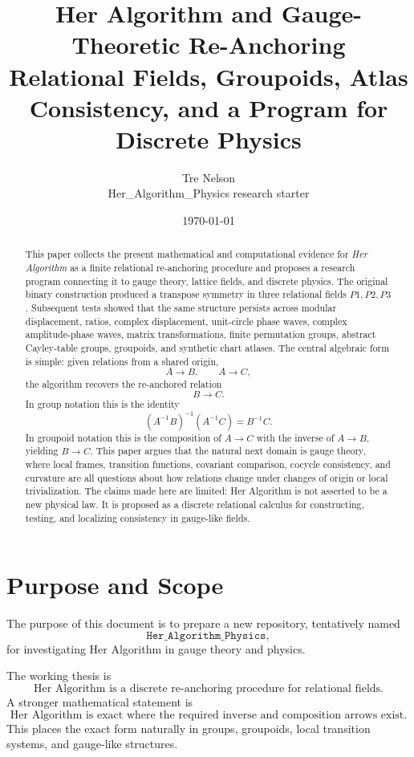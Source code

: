 \documentclass[11pt]{article}
\title{\textbf{Her Algorithm and Gauge-Theoretic Re-Anchoring}\\
\large Relational Fields, Groupoids, Atlas Consistency, and a Program for Discrete Physics}
\author{Tre Nelson\\\small Her\_Algorithm\_Physics research starter}
\date{\today}
\newcommand{\HA}{Her Algorithm}
\begin{document}
\maketitle

\begin{abstract}
This paper collects the present mathematical and computational evidence for \emph{Her Algorithm} as a finite relational re-anchoring procedure and proposes a research program connecting it to gauge theory, lattice fields, and discrete physics. The original binary construction produced a transpose symmetry in three relational fields \(P1,P2,P3\). Subsequent tests showed that the same structure persists across modular displacement, ratios, complex displacement, unit-circle phase waves, complex amplitude-phase waves, matrix transformations, finite permutation groups, abstract Cayley-table groups, groupoids, and synthetic chart atlases. The central algebraic form is simple: given relations from a shared origin,
\[
A\to B,\qquad A\to C,
\]
the algorithm recovers the re-anchored relation
\[
B\to C.
\]
In group notation this is the identity
\[
(A^{-1}B)^{-1}(A^{-1}C)=B^{-1}C.
\]
In groupoid notation this is the composition of \(A\to C\) with the inverse of \(A\to B\), yielding \(B\to C\). This paper argues that the natural next domain is gauge theory, where local frames, transition functions, covariant comparison, cocycle consistency, and curvature are all questions about how relations change under changes of origin or local trivialization. The claims made here are limited: \HA{} is not asserted to be a new physical law. It is proposed as a discrete relational calculus for constructing, testing, and localizing consistency in gauge-like fields.
\end{abstract}

\tableofcontents

\section{Purpose and Scope}

The purpose of this document is to prepare a new repository, tentatively named
\[
\texttt{Her\_Algorithm\_Physics},
\]
for investigating \HA{} in gauge theory and physics.

The working thesis is
\[
\boxed{\text{\HA{} is a discrete re-anchoring procedure for relational fields.}}
\]
A stronger mathematical statement is
\[
\boxed{\text{\HA{} is exact where the required inverse and composition arrows exist.}}
\]
This places the exact form naturally in groups, groupoids, local transition systems, and gauge-like structures.
\end{document}
